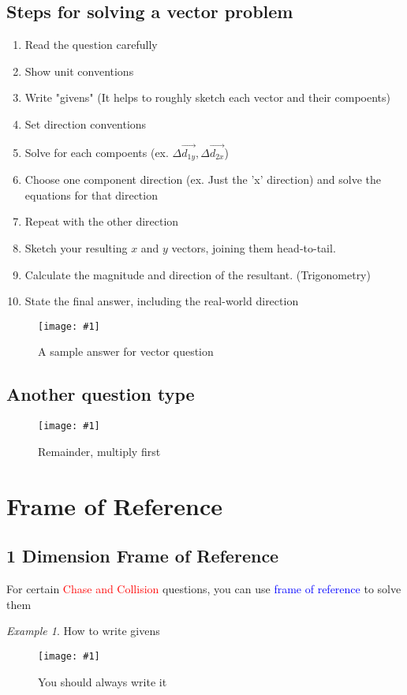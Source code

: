 \documentclass[11pt]{report}
\theoremstyle{remark}
\newtheorem*{example}{Example}
\newcommand{\mypic}[3]{
    \begin{figure}[h!]
        \centering
        \texttt{[image: \#1]}
        \caption{#2}
    \end{figure}
}
\begin{document}
\subsection{Steps for solving a vector problem}
\begin{enumerate}
    \item Read the question carefully
    \item Show unit conventions
    \item Write "givens" (It helps to roughly sketch each vector and their compoents)
    \item Set direction conventions
    \item Solve for each compoents (ex. $\Delta\vec{d_{1y}}, \Delta\vec{d_{2x}}$)
    \item Choose one component direction (ex. Just the 'x' direction) and solve the equations for that direction
    \item Repeat with the other direction
    \item Sketch your resulting $x$ and $y$ vectors, joining them head-to-tail. 
    \item Calculate the magnitude and direction of the resultant. (Trigonometry)
    \item State the final answer, including the real-world direction
\end{enumerate}

\mypic{graph/graph1.png}{A sample answer for vector question}{0.8}

\subsection{Another question type}
\mypic{graph/teacherNote2.png}{Remainder, multiply first}{0.9}

\newpage
\section{Frame of Reference}
\subsection{1 Dimension Frame of Reference}
For certain \textcolor{red}{Chase and Collision} questions, you can use \textcolor{blue}{frame of reference} 
to solve them
\begin{example}
    How to write givens\\
    \mypic{graph/graph2.png}{You should always write it}{0.7}
\end{example}
\newpage
\end{document}

